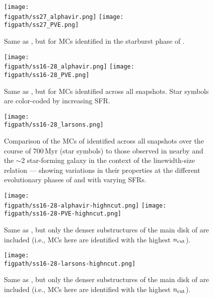 \IfFileExists{emulateapjlegacy.cls}{\documentclass[iop]{emulateapjlegacy}}{\documentclass[iop]{emulateapj}}
\begin{document}
\begin{figure}[htbp]
\centering
\texttt{[image: \\figpath/ss27\_alphavir.png]}
\texttt{[image: \\figpath/ss27\_PVE.png]}
\caption{
Same as , but for MCs identified in the starburst phase of \flower.
\label{fig:alpha27}}
\end{figure}






\begin{figure}[htbp]
\centering
\texttt{[image: \\figpath/ss16-28\_alphavir.png]}
\texttt{[image: \\figpath/ss16-28\_PVE.png]}
\caption{
Same as , but for MCs identified across all snapshots. 
Star symbols are color-coded by increasing SFR.
\label{fig:alpha16-28}}
\end{figure}

\begin{figure*}[htbp]
\centering
\texttt{[image: \\figpath/ss16-28\_larsons.png]}
\caption{
Comparison of the MCs of \flower identified across all snapshots over the course of 700\,Myr (star symbols)
to those observed in nearby and the \z$\sim$2 star-forming galaxy
in the context of the linewidth-size relation --- showing variations in their properties at 
the different evolutionary phases of \flower and with varying SFRs.
\label{fig:larsons16-28}}
\end{figure*}


\begin{figure}[htbp]
\centering
\texttt{[image: \\figpath/ss16-28-alphavir-highncut.png]}
\texttt{[image: \\figpath/ss16-28-PVE-highncut.png]}
\caption{
Same as , but only the denser substructures of the main disk of \flower are included
(i.e., MCs here are identified with the highest $n_{\rm cut}$).
\label{fig:alpha16-28-highncut}}
\end{figure}

\begin{figure*}[htbp]
\centering
\texttt{[image: \\figpath/ss16-28-larsons-highncut.png]}
\caption{
Same as , but only the denser substructures of the main disk of \flower are included
(i.e., MCs here are identified with the highest $n_{\rm cut}$).
\label{fig:larsons16-28-highncut}}
\end{figure*}
\end{document}
